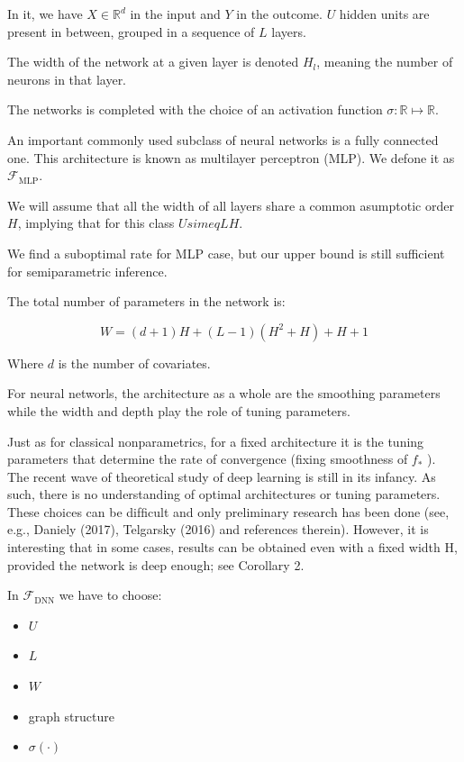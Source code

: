 \documentclass{article}
\begin{document}
In it, we have $X \in \mathbb{R}^d$ in the input and $Y$ in the outcome. $U$ hidden units are present in between, grouped in a sequence of $L$ layers.

The width of the network at a given layer is denoted $H_l$, meaning the number of neurons in that layer.

The networks is completed with the choice of an activation function $\sigma: \mathbb{R} \mapsto \mathbb{R}$.

An important commonly used subclass of neural networks is a fully connected one. This architecture is known as multilayer perceptron (MLP). We defone it as $\mathcal{F}_{\text{MLP}}$.

We will assume that all the width of all layers share a common asumptotic order $H$, implying that for this class $U simeq LH$.

We find a suboptimal rate for MLP case, but our upper bound is still sufficient for semiparametric inference.

The total number of parameters in the network is:

$$
W = (d + 1) H + (L - 1) (H^2 + H) + H + 1
$$

Where $d$ is the number of covariates.

For neural networls, the architecture as a whole are the smoothing parameters while the width and depth play the role of tuning parameters.

Just as for classical nonparametrics, for a ﬁxed architecture it is the tuning parameters that determine the rate of convergence (ﬁxing smoothness of $f_*$ ). The recent wave of theoretical study of deep learning is still in its infancy. As such, there is no understanding of optimal architectures or tuning parameters. These choices can be difﬁcult and only preliminary research has been done (see, e.g., Daniely (2017), Telgarsky (2016) and references therein). However, it is interesting that in some cases, results can be obtained even with a ﬁxed width H, provided the network is deep enough; see Corollary 2.


In $\mathcal{F}_{\text{DNN}}$ we have to choose:
\begin{itemize}
  \item $U$
  \item $L$
  \item $W$
  \item graph structure
  \item $\sigma(\cdot)$
\end{itemize}
\end{document}

